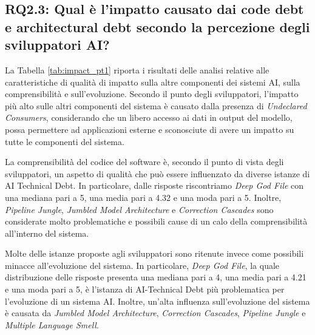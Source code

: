 \subsection{RQ2.3: Qual è l’impatto causato dai code debt e architectural debt secondo la percezione degli sviluppatori AI?}

La Tabella \ref{tab:impact_pt1} riporta i risultati delle analisi relative alle caratteristiche di qualità di impatto sulla altre componenti dei sistemi AI, sulla comprensibilità e sull'evoluzione.
Secondo il punto degli sviluppatori, l'impatto più alto sulle altri componenti del sistema è causato dalla presenza di \textit{Undeclared Consumers}, considerando che un libero accesso ai dati in output del modello, possa permettere ad applicazioni esterne e sconosciute di avere un impatto su tutte le componenti del sistema.

La comprensibilità del codice del software è, secondo il punto di vista degli sviluppatori, un aspetto di qualità che può essere influenzato da diverse istanze di AI Technical Debt. In particolare, dalle risposte riscontriamo \textit{Deep God File} con una mediana pari a 5, una media pari a 4.32 e una moda pari a 5. 
Inoltre, \textit{Pipeline Jungle}, \textit{Jumbled Model Architecture} e \textit{Correction Cascades} sono considerate molto problematiche e possibili cause di un calo della comprensibilità all'interno del sistema.

Molte delle istanze proposte agli sviluppatori sono ritenute invece come possibili minacce all'evoluzione del sistema.
In particolare, \textit{Deep God File}, la quale distribuzione delle risposte presenta una mediana pari a 4, una media pari a 4.21 e una moda pari a 5, è l'istanza di AI-Technical Debt più problematica per l'evoluzione di un sistema AI.
Inoltre, un'alta influenza sull'evoluzione del sistema è causata da \textit{Jumbled Model Architecture}, \textit{Correction Cascades}, \textit{Pipeline Jungle} e \textit{Multiple Language Smell}.



